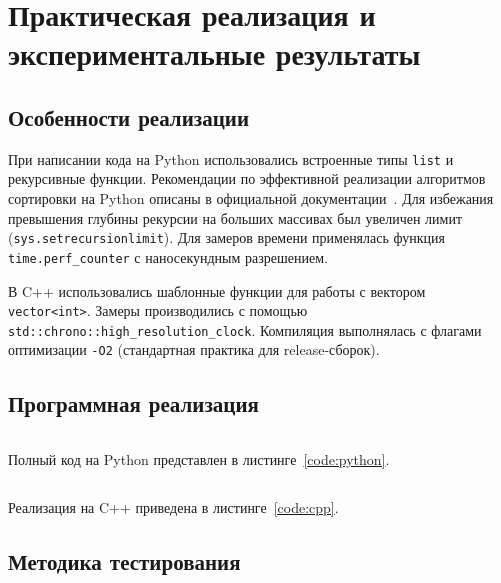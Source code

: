 \section{Практическая реализация и экспериментальные результаты}

\subsection{Особенности реализации}

При написании кода на Python использовались встроенные типы \texttt{list} и рекурсивные функции. Рекомендации по эффективной реализации алгоритмов сортировки на Python описаны в официальной документации~\cite{python_sort}. Для избежания превышения глубины рекурсии на больших массивах был увеличен лимит (\texttt{sys.setrecursionlimit}). Для замеров времени применялась функция \texttt{time.perf\_counter} с наносекундным разрешением.

В C++ использовались шаблонные функции для работы с вектором \texttt{vector<int>}. Замеры производились с помощью \texttt{std::chrono::high\_resolution\_clock}. Компиляция выполнялась с флагами оптимизации \texttt{-O2} (стандартная практика для release-сборок).

\subsection{Программная реализация}

\label{code:python}
\inputminted[breaklines, linenos, fontsize=\small]{python}{code/sort_python.py}

Полный код на Python представлен в листинге~\ref{code:python}.

\vspace{1cm}

\label{code:cpp}
\inputminted[breaklines, linenos, fontsize=\small]{cpp}{code/sort_cpp.cpp}

Реализация на C++ приведена в листинге~\ref{code:cpp}.

\subsection{Методика тестирования}

